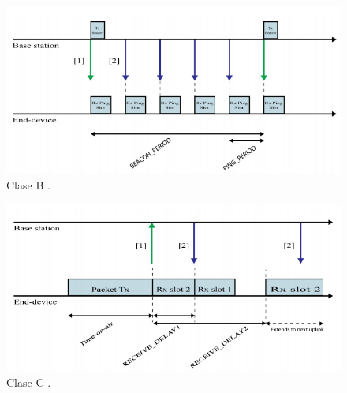 \begin{figure}[h]
	\centering
	\includegraphics[scale=.75]{./Figures/LoraClaseB.PNG}
	\caption{Clase B \cite{Ruano2016}.}
	\label{fig:LoraClaseB}
\end{figure}


\begin{figure}[h]
	\centering
	\includegraphics[scale=.65]{./Figures/LoraClaseC.PNG}
	\caption{Clase C \cite{Ruano2016}.}
	\label{fig:LoraClaseC}
\end{figure}





                                                        
